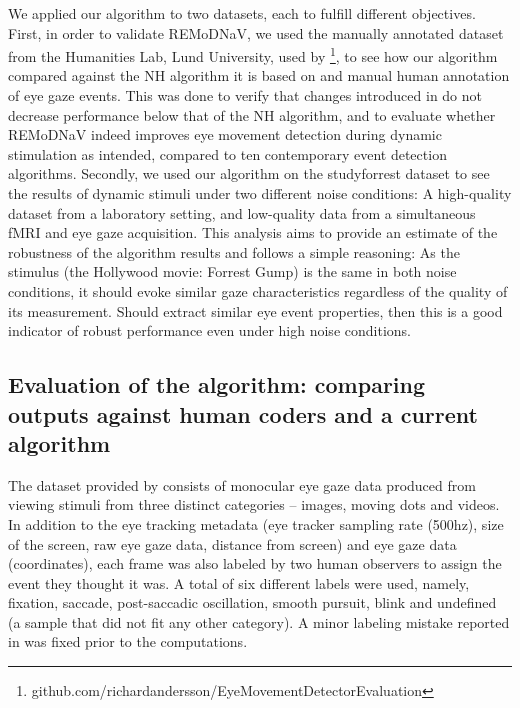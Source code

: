 We applied our algorithm to two datasets, each to fulfill different objectives. First, in order to validate REMoDNaV,
we used the manually annotated dataset from the Humanities Lab, Lund University, used by
\cite{Andersson2017}\footnote{github.com/richardandersson/EyeMovementDetector\linebreak[0]Evaluation}, to see how our algorithm
compared against the NH algorithm it is based on and manual human annotation of eye gaze events. This was done to
verify that changes introduced in \remodnav do not decrease performance below that of the NH algorithm, and to
evaluate whether REMoDNaV indeed improves eye movement detection during dynamic stimulation as intended, compared
to ten contemporary event detection algorithms. Secondly, we used our algorithm on the studyforrest dataset
\citep{Hanke2016} to see the results of dynamic stimuli under two different noise conditions: A high-quality
dataset from a laboratory setting, and low-quality data from a simultaneous fMRI and eye gaze acquisition.
This analysis aims to provide an estimate of the robustness of the algorithm results and follows a simple reasoning:
As the stimulus (the Hollywood movie: Forrest Gump) is the same in both noise conditions, it should evoke similar
gaze characteristics regardless of the quality of its measurement. Should \remodnav extract similar eye event
properties, then this is a good indicator of robust performance even under high noise conditions.

\subsection*{Evaluation of the algorithm: comparing outputs against human coders and a current algorithm}\label{ana_1}

The dataset provided by \cite{Andersson2017} consists of monocular eye gaze data produced from viewing stimuli from
three distinct categories -- images, moving dots and videos. In addition to the eye tracking metadata (eye tracker
sampling rate (500hz), size of the screen, raw eye gaze data, distance from screen) and eye gaze data (coordinates),
each frame was also labeled by two human observers to assign the event they thought it was. A total of six different
labels were used, namely, fixation, saccade, post-saccadic oscillation, smooth pursuit, blink and undefined (a sample
that did not fit any other category). A minor labeling mistake reported in \cite{Zemblys2018} was fixed prior to the
computations.

